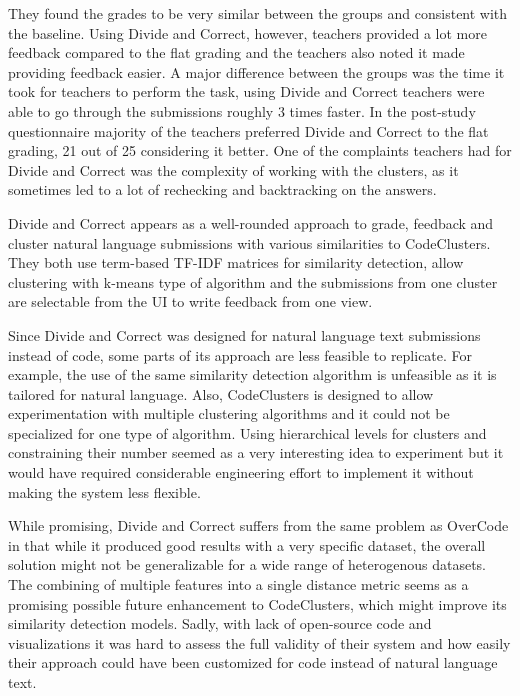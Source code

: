 They found the grades to be very similar between the groups and consistent with the baseline. Using Divide and Correct, however, teachers provided a lot more feedback compared to the flat grading and the teachers also noted it made providing feedback easier. A major difference between the groups was the time it took for teachers to perform the task, using Divide and Correct teachers were able to go through the submissions roughly 3 times faster. In the post-study questionnaire majority of the teachers preferred Divide and Correct to the flat grading, 21 out of 25 considering it better. One of the complaints teachers had for Divide and Correct was the complexity of working with the clusters, as it sometimes led to a lot of rechecking and backtracking on the answers.

Divide and Correct appears as a well-rounded approach to grade, feedback and cluster natural language submissions with various similarities to CodeClusters. They both use term-based TF-IDF matrices for similarity detection, allow clustering with k-means type of algorithm and the submissions from one cluster are selectable from the UI to write feedback from one view.

Since Divide and Correct was designed for natural language text submissions instead of code, some parts of its approach are less feasible to replicate. For example, the use of the same similarity detection algorithm is unfeasible as it is tailored for natural language. Also, CodeClusters is designed to allow experimentation with multiple clustering algorithms and it could not be specialized for one type of algorithm. Using hierarchical levels for clusters and constraining their number seemed as a very interesting idea to experiment but it would have required considerable engineering effort to implement it without making the system less flexible.

While promising, Divide and Correct suffers from the same problem as OverCode in that while it produced good results with a very specific dataset, the overall solution might not be generalizable for a wide range of heterogenous datasets. The combining of multiple features into a single distance metric seems as a promising possible future enhancement to CodeClusters, which might improve its similarity detection models. Sadly, with lack of open-source code and visualizations it was hard to assess the full validity of their system and how easily their approach could have been customized for code instead of natural language text.
